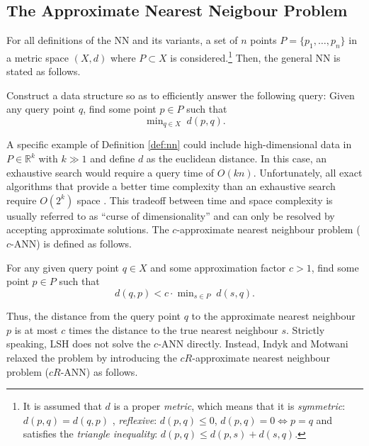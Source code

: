 \subsection{The Approximate Nearest Neigbour Problem}\label{subsec:approximate_nearest_neighbour_problem}

For all definitions of the NN and its variants, a set of $n$ points $P = \{p_1, \dots, p_n \}$ in a metric space $(X, d)$ where $P \subset X$ is considered.\footnote{It is assumed that $d$ is a proper \textit{metric}, which means that it is \textit{symmetric}: $d(p,q)=d(q,p)$ , \textit{reflexive}: $d(p,q) \leq 0$, $d(p,q)=0 \iff p=q$ and satisfies the \textit{triangle inequality}: $d(p,q) \leq d(p,s) + d(s,q)$.} Then, the general NN is stated as follows.

\begin{definition}\label{def:nn}
     Construct a data structure so as to efficiently answer the following query: Given any query point $q$, find some point $p \in P$ such that
    \begin{equation}
        \mathop{\text{min}}_{q \in X} \; d(p, q).
    \end{equation}
\end{definition}

A specific example of Definition \ref{def:nn} could include high-dimensional data in $P \in \mathbb{R}^k$ with $k \gg 1$ and define $d$ as the euclidean distance. In this case, an exhaustive search would require a query time of $O(kn)$. Unfortunately, all exact algorithms that provide a better time complexity than an exhaustive search require $O(2^k)$ space \cite{rubinstein2018hardness}. This tradeoff between time and space complexity is usually referred to as ``curse of dimensionality'' and can only be resolved by accepting approximate solutions. The $c$-approximate nearest neighbour problem ($c$-ANN) is defined as follows.

\begin{definition}
    For any given query point $q \in X$ and some approximation factor $c > 1$, find some point $p \in P$ such that
    \begin{equation}
        d(q,p) < c \cdot \mathop{\text{min}}_{s \in P} \; d(s, q).
    \end{equation}
\end{definition}

Thus, the distance from the query point $q$ to the approximate nearest neighbour $p$ is at most $c$ times the distance to the true nearest neighbour $s$. Strictly speaking, LSH does not solve the $c$-ANN directly. Instead, Indyk and Motwani relaxed the problem by introducing the $cR$-approximate nearest neighbour problem ($cR$-ANN) as follows.

